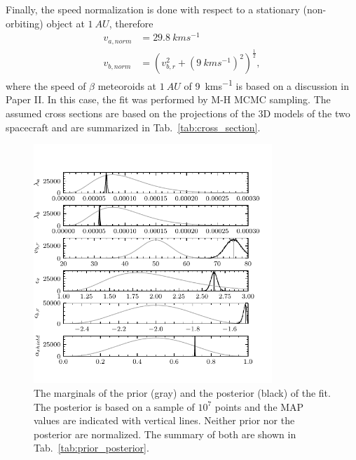 Finally, the speed normalization is done with respect to a stationary (non-orbiting) object at $\SI{1}{AU}$, therefore
\begin{equation}\begin{split}
    v_{a,norm} & = \SI{29.8}{kms^{-1}} \\
    v_{b,norm} & = \left( v_{b,r}^2 + \left(\SI{9}{kms^{-1}}\right)^2 \right)^\frac{1}{2},
\end{split}\end{equation}
where the speed of $\beta$ meteoroids at $\SI{1}{AU}$ of \SI{9}{kms^{-1}} is based on a discussion in Paper II. In this case, the fit was performed by M-H MCMC sampling. The assumed cross sections are based on the projections of the 3D models \citep{psp_model,solo_model} of the two spacecraft and are summarized in Tab.~\ref{tab:cross_section}.

\begin{figure}[h]
 	\centering
 	\includegraphics[width=9cm]{figures/both_shield.pdf}
 	\caption{The marginals of the prior (gray) and the posterior (black) of the fit. The posterior is based on a sample of $10^7$ points and the MAP values are indicated with vertical lines. Neither prior nor the posterior are normalized. The summary of both are shown in Tab.~\ref{tab:prior_posterior}.}
 	\label{fig:fit_posteriors}
\end{figure}

